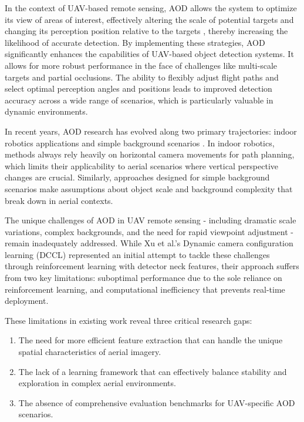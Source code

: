 \documentclass[lettersize,journal]{IEEEtran}
\begin{document}
In the context of UAV-based remote sensing, AOD allows the system to optimize its view of areas of interest, effectively altering the scale of potential targets and changing its perception position relative to the targets , thereby increasing the likelihood of accurate detection.
By implementing these strategies, AOD significantly enhances the capabilities of UAV-based object detection systems. It allows for more robust performance in the face of challenges like multi-scale targets and partial occlusions. The ability to flexibly adjust flight paths and select optimal perception angles and positions leads to improved detection accuracy across a wide range of scenarios, which is particularly valuable in dynamic environments.

In recent years, AOD research has evolved along two primary trajectories: indoor robotics applications \cite{dataset2017, active2019, behavior2023, novel2021, active2022} and simple background scenarios \cite{enhancing2021,selfsupervised2022}. In indoor robotics, methods always rely heavily on horizontal camera movements for path planning, which limits their applicability to aerial scenarios where vertical perspective changes are crucial. Similarly, approaches designed for simple background scenarios make assumptions about object scale and background complexity that break down in aerial contexts.

The unique challenges of AOD in UAV remote sensing - including dramatic scale variations, complex backgrounds, and the need for rapid viewpoint adjustment - remain inadequately addressed. While Xu et al.'s Dynamic camera configuration learning (DCCL) \cite{dynamic2021} represented an initial attempt to tackle these challenges through reinforcement learning with detector neck features, their approach suffers from two key limitations: suboptimal performance due to the sole reliance on reinforcement learning, and computational inefficiency that prevents real-time deployment.

These limitations in existing work reveal three critical research gaps:
\begin{enumerate}
\item{The need for more efficient feature extraction that can handle the unique spatial characteristics of aerial imagery.}
\item{The lack of a learning framework that can effectively balance stability and exploration in complex aerial environments.}
\item{The absence of comprehensive evaluation benchmarks for UAV-specific AOD scenarios.}
\end{enumerate}
\end{document}
